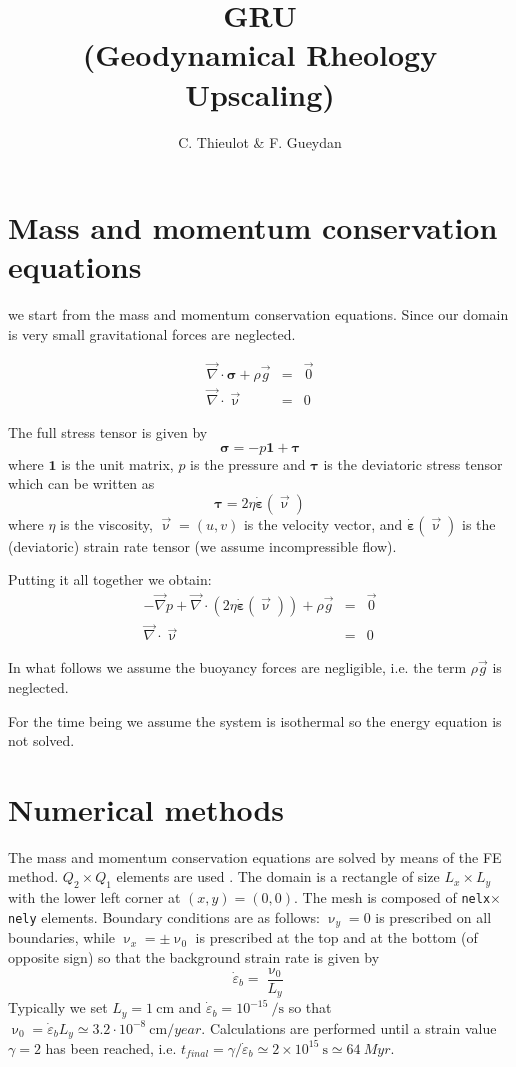 \documentclass[a4paper]{article}
\title{{\Large \bf GRU} \\ (Geodynamical Rheology Upscaling)}
\author{C. Thieulot \& F. Gueydan}
\begin{document}
\maketitle


\section{Mass and momentum conservation equations}

we start from the mass and momentum conservation equations.
Since our domain is very small gravitational forces are neglected.

\begin{eqnarray}
\vec\nabla \cdot \bm \sigma + \rho \vec{g} &=& \vec{0} \\
\vec\nabla \cdot \vec\upnu &=& 0
\end{eqnarray}

The full stress tensor is given by
\[
\bm\sigma = -p {\bm 1} +  \bm \tau
\]
where ${\bm 1}$ is the unit matrix, $p$ is the pressure and 
${\bm\tau}$ is the deviatoric stress tensor which can be 
written as
\[
\bm\tau = 2 \eta \dot{\bm \varepsilon}(\vec\upnu)
\]
where $\eta$ is the viscosity, $\vec{\upnu}=(u,v)$ is the velocity vector, 
and $\dot{\bm \varepsilon}(\vec\upnu)$ is the (deviatoric) 
strain rate tensor (we assume incompressible flow).

Putting it all together we obtain:
\begin{eqnarray}
-\vec\nabla p + \vec\nabla \cdot (2 \eta \dot{\bm \varepsilon}(\vec\upnu)) + \rho \vec{g} &=& \vec{0} \\
\vec\nabla \cdot \vec\upnu &=& 0
\end{eqnarray}

In what follows we assume the buoyancy forces are negligible, i.e. 
the term $\rho \vec{g}$ is neglected.

For the time being we assume the system is isothermal 
so the energy equation is not solved.


\section{Numerical methods}

The mass and momentum conservation equations are 
solved by means of the FE method. 
$Q_2\times Q_1$ elements are used \cite{thba22}.
The domain is a rectangle of size $L_x \times L_y$
with the lower left corner at $(x,y)=(0,0)$.
The mesh is composed of \lstinline{nelx}$\times$\lstinline{nely} elements.
Boundary conditions are as follows: $\upnu_y=0$ is prescribed on 
all boundaries, while $\upnu_x=\pm \upnu_0$ is prescribed at the 
top and at the bottom (of opposite sign) so that the background 
strain rate is given by 
\[
\dot\varepsilon_b = \frac{\upnu_0}{L_y}
\]
Typically we set $L_y=1~\si{\cm}$ and 
$\dot\varepsilon_b =10^{-15}~\si{\per\second} $ so that 
$\upnu_0= \dot\varepsilon_b L_y \simeq 3.2\cdot 10^{-8}~\si{\cm\per year}$.
Calculations are performed until a strain value $\gamma=2$ 
has been reached, i.e. 
$t_{final} = \gamma/ \dot\varepsilon_b \simeq 2 \times 10^{15}~\si{\second} 
\simeq 64~\si{Myr}$.
\end{document}
